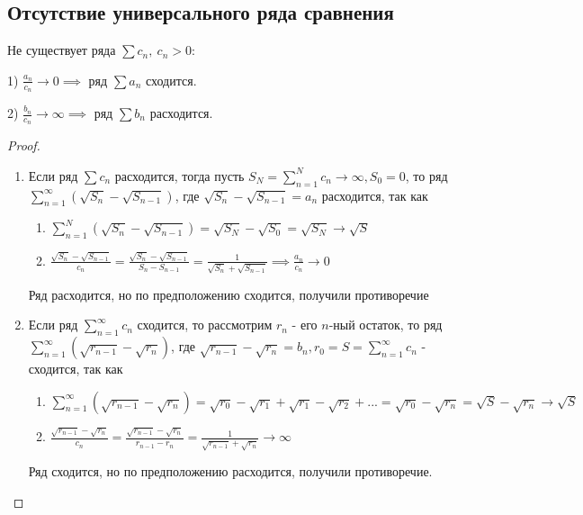 \subsection{Отсутствие универсального ряда сравнения}
	\begin{proposal}
	Не существует ряда $\sum c_n,\ c_n > 0:$ 
	
	1) $\frac{a_n}{c_n} \to 0 \implies$ ряд $\sum a_n$ сходится.
	
	2) $\frac{b_n}{c_n} \to \infty \implies$ ряд $\sum b_n$ расходится.
\end{proposal}

\begin{proof}~
	
	\begin{enumerate}
		\item Если ряд $\sum c_n$ расходится, тогда пусть $S_N = \sum_{n=1}^{N} c_n \to \infty, S_0=0$, то ряд $\sum_{n=1}^{\infty} (\sqrt{S_n} - \sqrt{S_{n - 1}})$, где $\sqrt{S_n} - \sqrt{S_{n - 1}} = a_n$ расходится, так как
		
		\begin{enumerate}
			\item $\sum_{n=1}^{N} (\sqrt{S_n} - \sqrt{S_{n-1}}) = \sqrt{S_N} - \sqrt{S_0} = \sqrt{S_N} \to \sqrt{S}$
			
			\item $\frac{\sqrt{S_n} - \sqrt{S_{n-1}}}{c_n} = \frac{\sqrt{S_n} - \sqrt{S_{n-1}}}{S_n - S_{n - 1}} = \frac{1}{\sqrt{S_n} + \sqrt{S_{n - 1}}} \implies \frac{a_n}{c_n} \to 0$
		\end{enumerate}
		
		Ряд расходится, но по предположению сходится, получили противоречие
		
		\item Если ряд $\sum_{n=1}^{\infty} c_n$ сходится, то рассмотрим $r_n$ - его $n$-ный остаток, то ряд $\sum_{n=1}^{\infty} (\sqrt{r_{n-1}} - \sqrt{r_n})$, где $\sqrt{r_{n-1}} - \sqrt{r_n} = b_n, r_0 = S = \sum_{n = 1}^{\infty} c_n$ - сходится, так как
		
		\begin{enumerate}
			\item $\sum_{n=1}^{\infty} (\sqrt{r_{n-1}} - \sqrt{r_n}) = \sqrt{r_0} - \sqrt{r_1} + \sqrt{r_1} - \sqrt{r_2} + ... = \sqrt{r_0} - \sqrt{r_n} = \sqrt{S} - \sqrt{r_n} \to \sqrt{S}$
			
			\item $\frac{\sqrt{r_{n-1}} - \sqrt{r_n}}{c_n} = \frac{\sqrt{r_{n-1}} - \sqrt{r_n}}{r_{n-1} - r_n} = \frac{1}{\sqrt{r_{n-1}} + \sqrt{r_n}} \to \infty$
		\end{enumerate}
		
		Ряд сходится, но по предположению расходится, получили противоречие.
	\end{enumerate}
\end{proof}